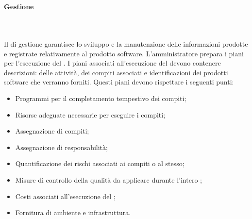 \paragraph{Gestione}\mbox{}\\ \\
Il  di gestione garantisce lo sviluppo e la manutenzione delle informazioni prodotte e registrate relativamente 
al prodotto software. L'amministratore prepara i piani per l'esecuzione del .
I piani associati all'esecuzione del  devono contenere descrizioni: delle attività, dei compiti associati e
identificazioni dei prodotti software che verranno forniti. Questi piani devono rispettare i seguenti punti:
\begin{itemize}
    \item Programmi per il completamento tempestivo dei compiti;
    \item Risorse adeguate necessarie per eseguire i compiti;
    \item Assegnazione di compiti;
    \item Assegnazione di responsabilità;
    \item Quantificazione dei rischi associati ai compiti o al  stesso;
    \item Misure di controllo della qualità da applicare durante l'intero ;
    \item Costi associati all'esecuzione del ;
    \item Fornitura di ambiente e infrastruttura.
\end{itemize}
